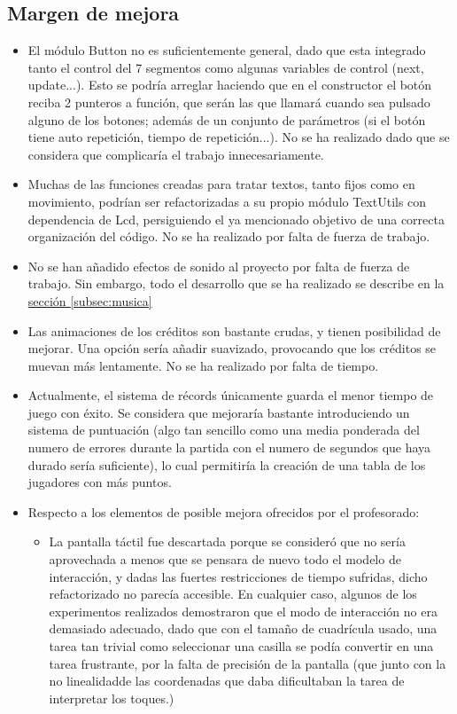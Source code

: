 \documentclass[12pt,letterpaper]{article}
\newcommand*{\iref}[2]{
  \hyperref[#1]{#2
  \ref*{#1}}
  }
\begin{document}
\subsection{Margen de mejora}
\label{subsec:mejora}
\begin{itemize}
  \item El módulo Button no es suficientemente general, dado que esta
    integrado tanto el control del 7 segmentos como algunas variables
    de control (next, update...). Esto se podría arreglar haciendo que
    en el constructor el botón reciba 2 punteros a función, que serán
    las que llamará cuando sea pulsado alguno de los botones; además
    de un conjunto de parámetros (si el botón tiene auto repetición,
    tiempo de repetición...). No se ha realizado dado que se considera
    que complicaría el trabajo innecesariamente.
  \item Muchas de las funciones creadas para tratar textos, tanto
    fijos como en movimiento, podrían ser refactorizadas a su propio
    módulo TextUtils con dependencia de Lcd, persiguiendo el ya
    mencionado objetivo de una correcta organización del código. No se
    ha realizado por falta de fuerza de trabajo.
  \item No se han añadido efectos de sonido al proyecto por falta de
    fuerza de trabajo. Sin embargo, todo el desarrollo que se ha
    realizado se describe en la \iref{subsec:musica}{sección}
  \item Las animaciones de los créditos son bastante crudas, y tienen
    posibilidad de mejorar. Una opción sería añadir suavizado,
    provocando que los créditos se muevan más lentamente. No se ha
    realizado por falta de tiempo.
  \item Actualmente, el sistema de récords únicamente guarda el menor
    tiempo de juego con éxito. Se considera que mejoraría bastante
    introduciendo un sistema de puntuación (algo tan sencillo como una
    media ponderada del numero de errores durante la partida con el
    numero de segundos que haya durado sería suficiente), lo cual
    permitiría la creación de una tabla de los jugadores con más
    puntos.
  \item Respecto a los elementos de posible mejora ofrecidos por el
    profesorado:
    \begin{itemize}
    \item La pantalla táctil fue descartada porque se consideró que no
      sería aprovechada a menos que se pensara de nuevo todo el modelo
      de interacción, y dadas las fuertes restricciones de tiempo
      sufridas, dicho refactorizado no parecía accesible. En cualquier
      caso, algunos de los experimentos realizados demostraron que el
      modo de interacción no era demasiado adecuado, dado que con el
      tamaño de cuadrícula usado, una tarea tan trivial como
      seleccionar una casilla se podía convertir en una tarea
      frustrante, por la falta de precisión de la pantalla (que junto
      con la no linealidad\footnotemark[1] de las coordenadas que daba
      dificultaban la tarea de interpretar los toques.)


\end{itemize}
\end{itemize}
\end{document}

